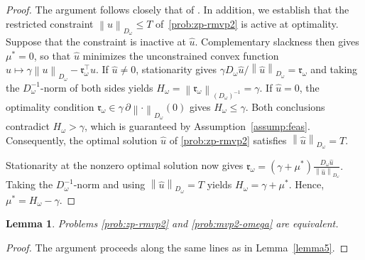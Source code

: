 \documentclass[11pt]{article}
\theoremstyle{plain}
\newtheorem{lemma}{Lemma}
\theoremstyle{definition}
\theoremstyle{plain}
\newcommand{\norm}[1]{\left\lVert#1\right\rVert}
\newcommand{\tpose}[1]{#1^{\top}}
\newcommand{\ccr}{{\mathfrak r}}
\begin{document}
\begin{proof}
The argument follows closely that of \cite[Proposition~2]{Pinar2016}. In addition, we establish that the restricted constraint $\norm{u}_{D_\omega}\leq T$ of~\eqref{prob:zp-rmvp2} is active at optimality. Suppose that the constraint is inactive at $\hat u$. Complementary slackness then gives $\mu^*=0$, so that $\hat u$ minimizes the unconstrained convex function $u\mapsto\gamma\norm{u}_{D_\omega}-\tpose{\ccr_\omega}u$. If $\hat u\neq 0$, stationarity gives $\gamma D_\omega\hat u/\norm{\hat u}_{D_\omega}=\ccr_\omega$ and taking the $D_\omega^{-1}$-norm of both sides yields $H_\omega=\norm{\ccr_\omega}_{(D_\omega)^{-1}}=\gamma$. If $\hat u=0$, the optimality condition $\ccr_\omega\in\gamma\,\partial\norm{\cdot}_{D_\omega}(0)$ gives $H_\omega\leq\gamma$. Both conclusions contradict $H_\omega>\gamma$, which is guaranteed by Assumption~\ref{assump:feas}. Consequently, the optimal solution $\hat{u}$ of \eqref{prob:zp-rmvp2} satisfies $\norm{\hat{u}}_{D_\omega}=T$.

Stationarity at the nonzero optimal solution now gives $\ccr_\omega
=(\gamma+\mu^*) \frac{D_\omega\hat u}{\norm{\hat u}_{D_\omega}}.$
Taking the $D_\omega^{-1}$-norm and using $\norm{\hat u}_{D_\omega}=T$ yields
$H_\omega=\gamma+\mu^*$. Hence, $\mu^*=H_\omega-\gamma$.
 \end{proof}
\begin{lemma}\label{lemma:equiv2}
Problems \eqref{prob:zp-rmvp2} and \eqref{prob:mvp2-omega} are equivalent.
\end{lemma}
\begin{proof}
The argument proceeds along the same lines as in Lemma~\ref{lemma5}.
\end{proof}
\end{document}

